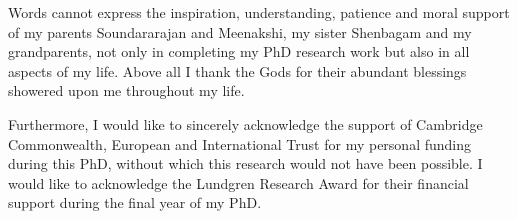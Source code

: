 \begin{acknowledgements}
Words cannot express the inspiration, understanding, patience and moral support 
of my parents Soundararajan and Meenakshi, my sister Shenbagam and my 
grandparents, not only in completing my PhD research work but also in all 
aspects of my life. Above all I thank the Gods for their abundant blessings 
showered upon me throughout my life.

Furthermore, I would like to sincerely acknowledge the support of Cambridge 
Commonwealth, European and International Trust for my personal funding during 
this PhD, without which this research would not have been possible. I would 
like to acknowledge the Lundgren Research Award for their financial support 
during the final year of my PhD.

\end{acknowledgements}

